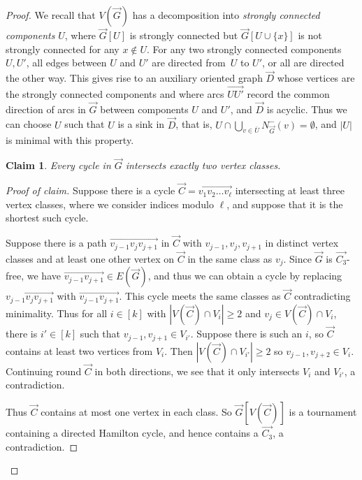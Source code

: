 \documentclass[a4paper, 12pt]{article}
\numberwithin{equation}{section}
\newtheorem{claim}[theorem]{Claim}
\newenvironment{proofclaim}[1][Proof of claim]{\begin{proof}[#1]\renewcommand*{\qedsymbol}{\(\blacksquare\)}}{\end{proof}}
\newcommand{\ova}[1]{\overrightarrow{#1}}
\begin{document}
\begin{proof}
We recall that $V(\ova{G})$ has a decomposition into \emph{strongly connected components} $U$, where $\ova{G}[U]$ is strongly connected but $\ova{G}[U \cup \{x\}]$ is not strongly connected for any $x \notin U$. For any two strongly connected components $U,U'$, all edges between $U$ and $U'$ are directed from~$U$ to $U'$, or all are directed the other way. This gives rise to an auxiliary oriented graph $\ova{D}$ whose vertices are the strongly connected components and where arcs $\ova{UU'}$ record the common direction of arcs in $\ova{G}$ between components $U$ and $U'$, and $\ova{D}$ is acyclic.
Thus we can choose $U$ such that $U$ is a sink in $\ova{D}$, that is, $U \cap \bigcup_{v \in \overline{U} } N^-_{\ova{G}}(v)  = \emptyset$, and $|U|$ is minimal with this property.

\begin{claim} \label{clm:C4}
Every cycle in $\ova{G}$ intersects exactly two vertex classes.
\end{claim}

\begin{proofclaim}
Suppose there is a cycle $\ova{C} = \ova{v_1v_2\ldots v_\ell}$ intersecting at least three vertex classes, where we consider indices modulo $\ell$, and suppose that it is the shortest such cycle.

Suppose there is a path $\ova{v_{j-1}v_jv_{j+1}}$ in $\ova{C}$ with $v_{j-1},v_j,v_{j+1}$ in distinct vertex classes and at least one other vertex on $\ova{C}$ in the same class as $v_j$. Since $\ova{G}$ is $\ova{C_3}$-free, we have $\ova{v_{j-1}v_{j+1}} \in E(\ova{G})$, and thus we can obtain a cycle by replacing $\ova{v_{j-1}v_jv_{j+1}}$ with $\ova{v_{j-1}v_{j+1}}$.
This cycle meets the same classes as $\ova{C}$ contradicting minimality.
Thus for all $i \in [k]$ with $|V(\ova{C}) \cap V_i| \geq 2$ and $v_j \in V(\ova{C}) \cap V_i$, there is $i' \in [k]$ such that $v_{j-1},v_{j+1} \in V_{i'}$.
Suppose there is such an $i$, so $\ova{C}$ contains at least two vertices from $V_i$.
Then $|V(\ova{C}) \cap V_{i'}| \geq 2$ so $v_{j-1},v_{j+2} \in V_i$.
Continuing round $\ova{C}$ in both directions, we see that it only intersects $V_i$ and $V_{i'}$, a contradiction.

Thus $\ova{C}$ contains at most one vertex in each class. So $\ova{G}[V(\ova{C})]$ is a tournament containing a directed Hamilton cycle, and hence contains a $\ova{C_3}$, a contradiction.
\end{proofclaim}


\end{proof}
\end{document}
